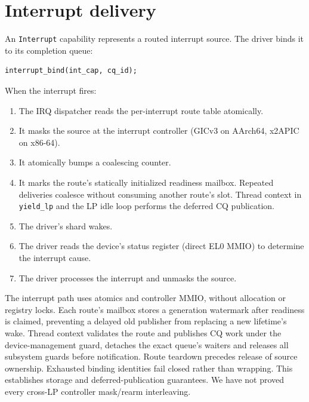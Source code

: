 \section{Interrupt delivery}

An \texttt{Interrupt} capability represents a routed interrupt source. The driver
binds it to its completion queue:

\begin{lstlisting}[style=rustCode]
interrupt_bind(int_cap, cq_id);
\end{lstlisting}

When the interrupt fires:

\begin{enumerate}
    \item The IRQ dispatcher reads the per-interrupt route table atomically.
    \item It masks the source at the interrupt controller (GICv3 on AArch64,
        x2APIC on x86-64).
    \item It atomically bumps a coalescing counter.
    \item It marks the route's statically initialized readiness mailbox.
        Repeated deliveries coalesce without consuming another route's slot.
        Thread context in \texttt{yield\_lp} and the LP idle loop performs
        the deferred CQ publication.
    \item The driver's shard wakes.
    \item The driver reads the device's status register (direct EL0 MMIO) to
        determine the interrupt cause.
    \item The driver processes the interrupt and unmasks the source.
\end{enumerate}

The interrupt path uses atomics and controller MMIO, without allocation or
registry locks. Each route's mailbox stores a generation watermark after
readiness is claimed, preventing a delayed old publisher from replacing a
new lifetime's wake. Thread context validates the route and publishes CQ work
under the device-management guard, detaches the exact queue's waiters and
releases all subsystem guards before notification. Route teardown precedes
release of source ownership. Exhausted binding identities fail closed rather
than wrapping. This establishes storage and deferred-publication guarantees.
We have not proved every cross-LP controller mask/rearm interleaving.

